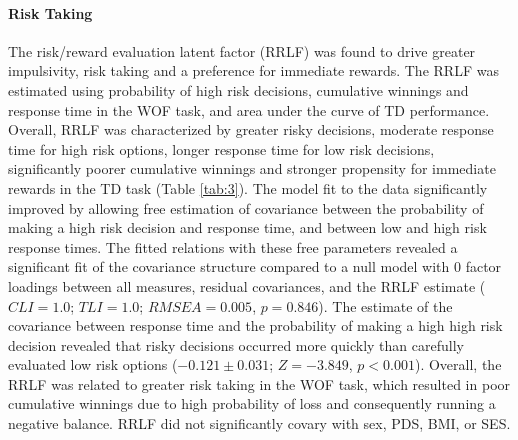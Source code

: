 \documentclass[utf8]{stylesheet}
\begin{document}
\paragraph{Risk Taking} The risk/reward evaluation latent factor (RRLF) was found to drive greater impulsivity, risk taking and a preference for immediate rewards. The RRLF was estimated using probability of high risk decisions, cumulative winnings and response time in the WOF task, and area under the curve of TD performance. Overall, RRLF was characterized by greater risky decisions, moderate response time for high risk options, longer response time for low risk decisions, significantly poorer cumulative winnings and stronger propensity for immediate rewards in the TD task (Table \ref{tab:3}). The model fit to the data significantly improved by allowing free estimation of covariance between the probability of making a high risk decision and response time, and between low and high risk response times. The fitted relations with these free parameters revealed a significant fit of the covariance structure compared to a null model with 0 factor loadings between all measures, residual covariances, and the RRLF estimate ($CLI = 1.0$; $TLI = 1.0$; $RMSEA = 0.005$, $p = 0.846$). The estimate of the covariance between response time and the probability of making a high high risk decision revealed that risky decisions occurred more quickly than carefully evaluated low risk options ($-0.121\pm0.031$; $Z=-3.849$, $p<0.001$). Overall, the RRLF was related to greater risk taking in the WOF task, which resulted in poor cumulative winnings due to high probability of loss and consequently running a negative balance. RRLF did not significantly covary with sex, PDS, BMI, or SES.
\end{document}
